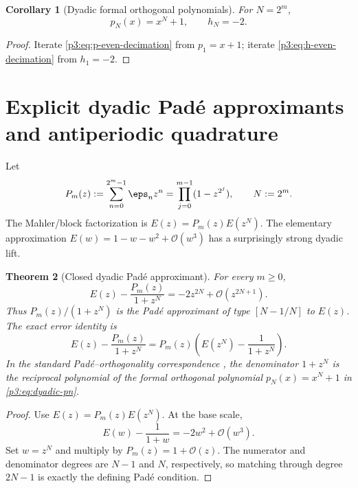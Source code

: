 \documentclass[11pt,oneside]{article}
\newtheorem{theorem}{Theorem}[section]
\newtheorem{corollary}[theorem]{Corollary}
\theoremstyle{definition}
\newcommand{\bigO}{\mathcal O}
\begin{document}
\begin{corollary}[Dyadic formal orthogonal polynomials]
\label{p3:cor:dyadic-pn}
For \(N=2^m\),
\begin{equation}
\boxed{
 p_N(x)=x^N+1,
 \qquad h_N=-2.}                                           \label{p3:eq:dyadic-pn}
\end{equation}
\end{corollary}

\begin{proof}
Iterate \eqref{p3:eq:p-even-decimation} from \(p_1=x+1\); iterate
\eqref{p3:eq:h-even-decimation} from \(h_1=-2\).
\end{proof}

\section{Explicit dyadic Pad\'e approximants and antiperiodic quadrature}
\label{p3:sec:dyadic-pade}

Let
\begin{equation}
 P_m(z):=\sum_{n=0}^{2^m-1}\eps_nz^n
        =\prod_{j=0}^{m-1}(1-z^{2^j}),
 \qquad N:=2^m.                                            \label{p3:eq:Pm-def}
\end{equation}
The Mahler/block factorization is \(E(z)=P_m(z)E(z^N)\).  The elementary approximation
\(E(w)=1-w-w^2+\bigO(w^3)\) has a surprisingly strong dyadic lift.

\begin{theorem}[Closed dyadic Pad\'e approximant]
\label{p3:thm:dyadic-pade}
For every \(m\ge0\),
\begin{equation}
\boxed{
 E(z)-\frac{P_m(z)}{1+z^N}
 =-2z^{2N}+\bigO(z^{2N+1}).}                               \label{p3:eq:dyadic-pade}
\end{equation}
Thus \(P_m(z)/(1+z^N)\) is the Pad\'e approximant of type \([N-1/N]\) to \(E(z)\).
The exact error identity is
\begin{equation}
 E(z)-\frac{P_m(z)}{1+z^N}
 =P_m(z)\left(E(z^N)-\frac1{1+z^N}\right).                \label{p3:eq:dyadic-pade-error}
\end{equation}
In the standard Pad\'e--orthogonality correspondence \cite{p3:BakerGravesMorris,p3:Chihara}, the denominator \(1+z^N\) is the reciprocal polynomial of the formal orthogonal
polynomial \(p_N(x)=x^N+1\) in \eqref{p3:eq:dyadic-pn}.
\end{theorem}

\begin{proof}
Use \(E(z)=P_m(z)E(z^N)\).  At the base scale,
\[
 E(w)-\frac1{1+w}=-2w^2+\bigO(w^3).
\]
Set \(w=z^N\) and multiply by \(P_m(z)=1+\bigO(z)\).  The numerator and denominator
degrees are \(N-1\) and \(N\), respectively, so matching through degree \(2N-1\) is
exactly the defining Pad\'e condition.
\end{proof}
\end{document}
